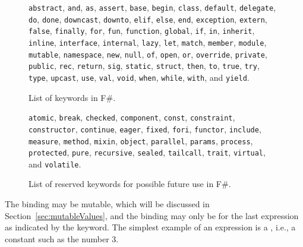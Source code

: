 \begin{figure}
  \mbox{\lstinline{abstract},} \mbox{\lstinline{and},} \mbox{\lstinline{as},} \mbox{\lstinline{assert},} \mbox{\lstinline{base},} \mbox{\lstinline{begin},} \mbox{\lstinline{class},} \mbox{\lstinline{default},} \mbox{\lstinline{delegate},} \mbox{\lstinline{do},} \mbox{\lstinline{done},} \mbox{\lstinline{downcast},} \mbox{\lstinline{downto},} \mbox{\lstinline{elif},} \mbox{\lstinline{else},} \mbox{\lstinline{end},} \mbox{\lstinline{exception},} \mbox{\lstinline{extern},} \mbox{\lstinline{false},} \mbox{\lstinline{finally},} \mbox{\lstinline{for},} \mbox{\lstinline{fun},} \mbox{\lstinline{function},} \mbox{\lstinline{global},} \mbox{\lstinline{if},} \mbox{\lstinline{in},} \mbox{\lstinline{inherit},} \mbox{\lstinline{inline},} \mbox{\lstinline{interface},} \mbox{\lstinline{internal},} \mbox{\lstinline{lazy},} \mbox{\lstinline{let},} \mbox{\lstinline{match},} \mbox{\lstinline{member},} \mbox{\lstinline{module},} \mbox{\lstinline{mutable},} \mbox{\lstinline{namespace},} \mbox{\lstinline{new},} \mbox{\lstinline{null},} \mbox{\lstinline{of},} \mbox{\lstinline{open},} \mbox{\lstinline{or},} \mbox{\lstinline{override},} \mbox{\lstinline{private},} \mbox{\lstinline{public},} \mbox{\lstinline{rec},} \mbox{\lstinline{return},} \mbox{\lstinline{sig},} \mbox{\lstinline{static},} \mbox{\lstinline{struct},} \mbox{\lstinline{then},} \mbox{\lstinline{to},} \mbox{\lstinline{true},} \mbox{\lstinline{try},} \mbox{\lstinline{type},} \mbox{\lstinline{upcast},} \mbox{\lstinline{use},} \mbox{\lstinline{val},} \mbox{\lstinline{void},} \mbox{\lstinline{when},} \mbox{\lstinline{while},} \mbox{\lstinline{with},} and \mbox{\lstinline{yield}.}
  \caption{List of keywords in F\#.}
  \label{fig:keywords}
\end{figure}
\begin{figure}
  \mbox{\lstinline{atomic},} \mbox{\lstinline{break},} \mbox{\lstinline{checked},} \mbox{\lstinline{component},} \mbox{\lstinline{const},} \mbox{\lstinline{constraint},} \mbox{\lstinline{constructor},} \mbox{\lstinline{continue},} \mbox{\lstinline{eager},} \mbox{\lstinline{fixed},} \mbox{\lstinline{fori},} \mbox{\lstinline{functor},} \mbox{\lstinline{include},} \mbox{\lstinline{measure},} \mbox{\lstinline{method},} \mbox{\lstinline{mixin},} \mbox{\lstinline{object},} \mbox{\lstinline{parallel},} \mbox{\lstinline{params},} \mbox{\lstinline{process},} \mbox{\lstinline{protected},} \mbox{\lstinline{pure},} \mbox{\lstinline{recursive},} \mbox{\lstinline{sealed},} \mbox{\lstinline{tailcall},} \mbox{\lstinline{trait},} \mbox{\lstinline{virtual},} and \mbox{\lstinline{volatile}.}
  \caption{List of reserved keywords for possible future use in F\#.}
  \label{fig:reservedKeywords}
\end{figure}
The binding may be mutable, which will be discussed in Section~\ref{sec:mutableValues}, and the binding may only be for the last expression as indicated by the  keyword. The simplest example of an expression is a , i.e., a constant such as the number 3. 


